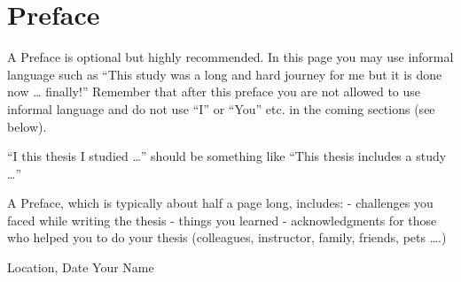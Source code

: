 
\pagestyle{empty}
\chapter*{Preface}

A Preface is optional but highly recommended. In this page you may use informal language 
such as “This study was a long and hard journey for me but it is done now … finally!”  
Remember that after this preface you are not allowed to use informal language and do not use “I” or “You” etc. 
in the coming sections (see below).

“I this thesis I studied …” should be something like “This thesis includes a study …”

A Preface, which is typically about half a page long, includes:
-	challenges you faced while writing the thesis
-	things you learned
-	acknowledgments for those who helped you to do your thesis (colleagues, instructor, family, friends, pets ….)

Location, Date
Your Name


\clearpage

